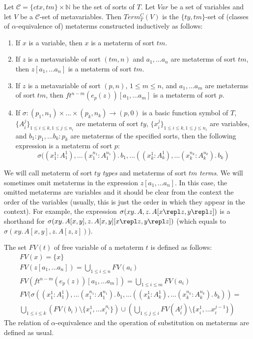Let $\mathcal{C} = \{ ctx, tm \} \times \mathbb{N}$ be the set of sorts of $T$.
Let $Var$ be a set of variables and let $V$ be a $\mathcal{C}$-set of metavariables.
Then $Term^C_T(V)$ is the $\{ ty, tm \}$-set of (classes of $\alpha$-equivalence of) metaterms constructed inductively as follows:
\begin{enumerate}
\item If $x$ is a variable, then $x$ is a metaterm of sort $tm$.
\item If $z$ is a metavariable of sort $(tm,n)$ and $a_1, \ldots a_n$ are metaterms of sort $tm$, then $z[a_1, \ldots a_n]$ is a metaterm of sort $tm$.
\item If $z$ is a metavariable of sort $(p,n)$, $1 \leq m \leq n$, and $a_1, \ldots a_m$ are metaterms of sort $tm$, then $ft^{n-m}(e_p(z))[a_1, \ldots a_m]$ is a metaterm of sort $p$.
\item If $\sigma : (p_1,n_1) \times \ldots \times (p_k,n_k) \to (p,0)$ is a basic function symbol of $T$, $\{ A^j_i \}_{1 \leq i \leq k, 1 \leq j \leq n_i}$ are metaterm of sort $ty$,
$\{ x^j_i \}_{1 \leq i \leq k, 1 \leq j \leq n_i}$ are variables, and $b_1 : p_1, \ldots b_k : p_k$ are metaterms of the specified sorts,
then the following expression is a metaterm of sort $p$:
\[ \sigma((x^1_1 : A^1_1), \ldots (x^{n_1}_1 : A^{n_1}_1).\,b_1, \ldots ((x^1_k : A^1_k), \ldots (x^{n_k}_k : A^{n_k}_k).\,b_k) \]
\end{enumerate}
We will call metaterm of sort $ty$ \emph{types} and metaterms of sort $tm$ \emph{terms}.
We will sometimes omit metaterms in the expression $z[a_1, \ldots a_n]$.
In this case, the omitted metaterms are variables and it should be clear from the context the order of the variables (usually, this is just the order in which they appear in the context).
For example, the expression $\sigma(x y.\,A, z.\,A[x \repl z, y \repl z])$ is a shorthand for $\sigma(x y.\,A[x,y], z.\,A[x,y][x \repl z, y \repl z])$ (which equals to $\sigma(x y.\,A[x,y], z.\,A[z,z])$).

The set $FV(t)$ of free variable of a metaterm $t$ is defined as follows:
\begin{align*}
& FV(x) = \{ x \} \\
& FV(z[a_1, \ldots a_n]) = \bigcup_{1 \leq i \leq n} FV(a_i) \\
& FV(ft^{n-m}(e_p(z))[a_1, \ldots a_m]) = \bigcup_{1 \leq i \leq m} FV(a_i) \\
& FV(\sigma((x^1_1 : A^1_1), \ldots (x^{n_1}_1 : A^{n_1}_1).\,b_1, \ldots ((x^1_k : A^1_k), \ldots (x^{n_k}_k : A^{n_k}_k).\,b_k)) = \\
& \bigcup_{1 \leq i \leq k} (FV(b_i) \setminus \{ x^1_i, \ldots x^{n_i}_i \}) \cup (\bigcup_{1 \leq j \leq i} FV(A^j_i) \setminus \{ x^1_i, \ldots x^{j-1}_i \})
\end{align*}
The relation of $\alpha$-equivalence and the operation of substitution on metaterms are defined as usual.

